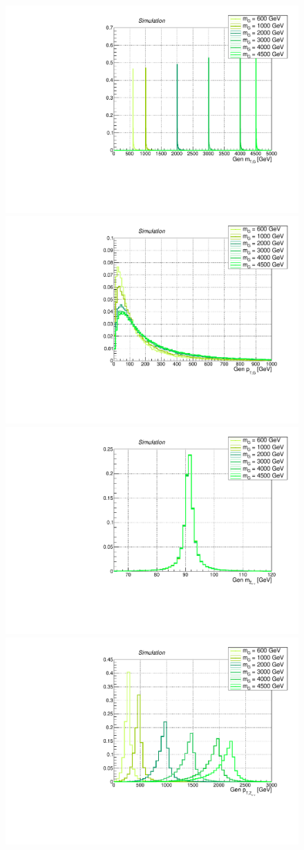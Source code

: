  \begin{figure}[!htb]
   \begin{center}
     \includegraphics[width=.495\textwidth]{Gen_v9/XZZInv_g_XMT.pdf}%
     \includegraphics[width=.495\textwidth]{Gen_v9/XZZInv_g_XPt.pdf}%
     \\
     \includegraphics[width=.495\textwidth]{Gen_v9/XZZInv_g_ZLepMass.pdf}%
     \includegraphics[width=.495\textwidth]{Gen_v9/XZZInv_g_ZLepPt.pdf}%
     \\

\end{center}
\end{figure}
